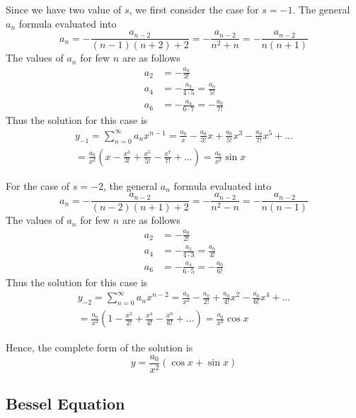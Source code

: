 \documentclass[../../main.tex]{subfiles}
\begin{document}
Since we have two value of $s$, we first consider the case for $s=-1$. The general $a_n$ formula evaluated into 
\begin{equation*}
  a_n=-\frac{a_{n-2}}{(n-1)(n+2)+2}=-\frac{a_{n-2}}{n^2+n}=-\frac{a_{n-2}}{n(n+1)}
\end{equation*}
The values of $a_n$ for few $n$ are as follows 
\begin{align*}
  a_2&=-\frac{a_0}{3!}\\
  a_4&=-\frac{a_2}{4\cdot 5}=\frac{a_0}{5!}\\
  a_6&=-\frac{a_4}{6\cdot7}=-\frac{a_0}{7!}
\end{align*}
Thus the solution for this case is 
\begin{multline*}
  y_{-1}=\sum_{n=0}^{\infty} a_nx^{n-1}=\frac{a_0}{x}-\frac{a_0}{3!}x+\frac{a_0}{5!}x^3-\frac{a_0}{7!}x^5 +\dots\\
  =\frac{a_0}{x^2}\left(x-\frac{x^3}{3!}+\frac{x^5}{5!}-\frac{x^7}{7!}+\dots\right)=\frac{a_0}{x^2}\sin x
\end{multline*}

For the case of $s=-2$, the general $a_n$ formula evaluated into
\begin{equation*}
  a_n=-\frac{a_{n-2}}{(n-2)(n+1)+2}=-\frac{a_{n-2}}{n^2-n}=-\frac{a_{n-2}}{n(n-1)}
\end{equation*}
The values of $a_n$ for few $n$ are as follows 
\begin{align*}
  a_2&=-\frac{a_0}{2!}\\
  a_4&=-\frac{a_2}{4\cdot 3}=\frac{a_0}{4!}\\
  a_6&=-\frac{a_4}{6\cdot 5}=-\frac{a_0}{6!}
\end{align*}
Thus the solution for this case is 
\begin{multline*}
  y_{-2}=\sum_{n=0}^{\infty} a_nx^{n-2}= \frac{a_0}{x^2}-\frac{a_0}{2!}+\frac{a_0}{4!}x^2-\frac{a_0}{6!}x^4 +\dots\\
  =\frac{a_0}{x^2}\left(1-\frac{x^2}{2!}+\frac{x^4}{4!}-\frac{x^6}{6!}+\dots\right)=\frac{a_0}{x^2}\cos x
\end{multline*}

Hence, the complete form of the solution is 
\begin{equation*}
  y=\frac{a_0}{x^2}\left(\cos x +\sin x\right)
\end{equation*}

\subsection{Bessel Equation}
\end{document}
